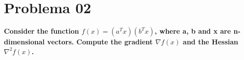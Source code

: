 \section*{Problema 02}

\textbf{Consider the function $f(x)=(a^Tx)(b^Tx)$, where a, b and x are n-dimensional vectors. Compute the gradient $\nabla f(x)$ and the Hessian $\nabla^2 f(x)$.}
